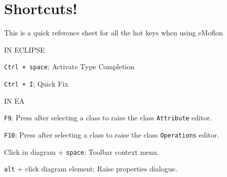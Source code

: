 \newpage
\section{Shortcuts!}
\genHeader

This is a quick reference sheet for all the hot keys when using eMoflon


IN ECLIPSE

\texttt{Ctrl + space}; Activate Type Completion

\texttt{Ctrl + I}; Quick Fix 

IN EA

\texttt{F9}; Press after selecting a class to raise the class \texttt{Attribute} editor.

\texttt{F10}; Press after selecting a class to raise the class \texttt{Operations} editor.

Click in diagram + \texttt{space}; Toolbar context menu.

\texttt{alt} + click diagram element; Raise properties dialogue.